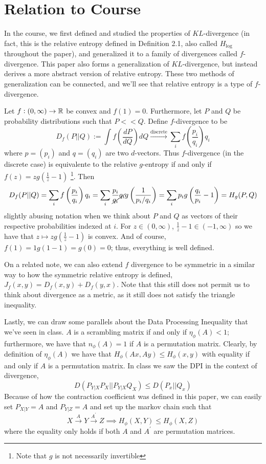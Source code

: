 \section{Relation to Course}
In the course, we first defined and studied the properties of $KL$-divergence (in fact, this is the relative entropy defined in Definition 2.1, also called $H_{\log}$ throughout the paper), and generalized it to a family of divergences called $f$-divergence. This paper also forms a generalization of $KL$-divergence, but instead derives a more abstract version of relative entropy. These two methods of generalization can be connected, and we'll see that relative entropy is a type of $f$-divergence. 

Let $f: (0, \infty) \to \mathbb{R}$ be convex and $f(1) = 0$. Furthermore, let $P$ and $Q$ be probability distributions such that $P <\!< Q$. Define $f$-divergence to be 
\[D_f(P || Q):= \int f\left(\frac{dP}{dQ}\right)dQ \xrightarrow{\text{discrete}} \sum_i f\left(\frac{p_i}{q_i}\right)q_i\]
where $p = (p_i)$ and $q = (q_i)$ are two $d$-vectors. Thus $f$-divergence (in the discrete case) is equivalente to the relative $g$-entropy if and only if $f(z) = z g\left(\frac{1}{z}-1\right)$ \footnote{Note that $g$ is not necessarily invertible}. Then \[D_f(P|| Q) = \sum_i f\left(\frac{p_i}{q_i}\right)q_i = \sum_i \frac{p_i}{\cancel{q_i}}\cancel{q_i}g\left(\frac{1}{p_i/q_i}\right)=\sum_i p_i g\left(\frac{q_i}{p_i} - 1\right) = H_g(P, Q)\]
slightly abusing notation when we think about $P$ and $Q$ as vectors of their respective probabilities indexed at $i$. For $z \in (0, \infty)$, $\frac{1}{z}-1 \in (-1, \infty)$ so we have that $z \mapsto zg\left(\frac{1}{z}-1\right)$ is convex. And of course, $f(1) = 1g(1 - 1) = g(0) = 0$; thus, everything is well defined.

On a related note, we can also extend $f$ divergence to be symmetric in a similar way to how the symmetric relative entropy is defined, $J_{f}(x,y) = D_f(x,y) + D_f(y,x)$. Note that this still does not permit us to think about divergence as a metric, as it still does not satisfy the triangle inequality.

Lastly, we can draw some parallels about the Data Processing Inequality that we've seen in class. $A$ is a scrambling matrix if and only if $\eta_{\phi}(A) < 1$; furthermore, we have that $n_\phi(A)=1$ if $A$ is a permutation matrix. Clearly, by definition of $\eta_\phi(A)$ we have that $H_{\phi}(Ax,Ay)  \leq H_{\phi}(x,y)$ with equality if and only if $A$ is a permutation matrix. In class we saw the DPI in the context of divergence,\[D(P_{Y|X}P_X||P_{Y|X}Q_X) \leq D(P_x||Q_x)\] Because of how the contraction coefficient was defined in this paper, we can easily set $P_{X|Y} = A$ and $P_{Y|Z} = A$ and set up the markov chain such that 
\[X \xrightarrow{A} Y \xrightarrow{A^\prime} Z \implies H_{\phi}(X,Y) \leq H_{\phi}(X,Z)\]
where the equality only holds if both $A$ and $A^\prime$ are permutation matrices.

    